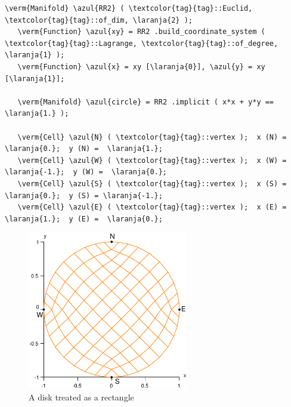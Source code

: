 \begin{Verbatim}[commandchars=\\\{\},formatcom=\small\tt,frame=single,
   label=parag-\ref{\numb section 2.\numb parag 9}.cpp,rulecolor=\color{coment},
   baselinestretch=0.94,framesep=2mm]
   \verm{Manifold} \azul{RR2} ( \textcolor{tag}{tag}::Euclid, \textcolor{tag}{tag}::of_dim, \laranja{2} );
   \verm{Function} \azul{xy} = RR2 .build_coordinate_system ( \textcolor{tag}{tag}::Lagrange, \textcolor{tag}{tag}::of_degree, \laranja{1} );
   \verm{Function} \azul{x} = xy [\laranja{0}], \azul{y} = xy [\laranja{1}];
   
   \verm{Manifold} \azul{circle} = RR2 .implicit ( x*x + y*y == \laranja{1.} );
   
   \verm{Cell} \azul{N} ( \textcolor{tag}{tag}::vertex );  x (N) =  \laranja{0.};  y (N) =  \laranja{1.};
   \verm{Cell} \azul{W} ( \textcolor{tag}{tag}::vertex );  x (W) = \laranja{-1.};  y (W) =  \laranja{0.};
   \verm{Cell} \azul{S} ( \textcolor{tag}{tag}::vertex );  x (S) =  \laranja{0.};  y (S) = \laranja{-1.};
   \verm{Cell} \azul{E} ( \textcolor{tag}{tag}::vertex );  x (E) =  \laranja{1.};  y (E) =  \laranja{0.};
\end{Verbatim}

\begin{figure}[ht] \centering
  \includegraphics[width=70mm]{disk}
  \caption{A disk treated as a rectangle}
  \label{\numb section 2.\numb fig 9}
\end{figure}

